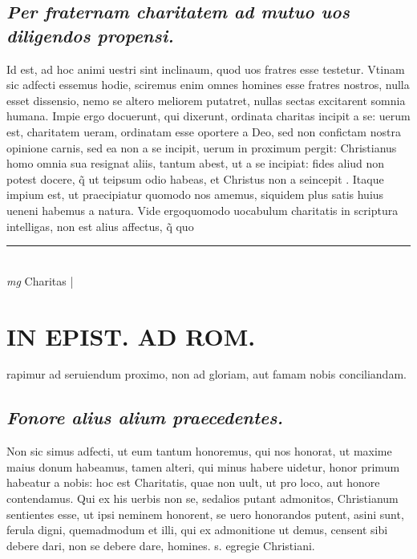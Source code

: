 \documentclass{article}
\begin{document}
\begin{pages}
\subsection*{\textit{Per fraternam charitatem ad mutuo uos diligendos propensi. }}\pstart Id est, ad hoc animi uestri sint inclinaum, quod uos fratres esse testetur. Vtinam sic adfecti essemus hodie, sciremus enim omnes homines esse fratres nostros, nulla esset dissensio, nemo se altero meliorem putatret, nullas sectas excitarent somnia humana. Impie ergo docuerunt, qui dixerunt, ordinata charitas incipit a se: uerum est, charitatem ueram, ordinatam esse oportere a Deo, sed non confictam nostra opinione carnis, sed ea non a se incipit, uerum in proximum pergit: Christianus homo omnia sua resignat aliis, tantum abest, ut a se incipiat: fides aliud non potest docere, q̃ ut teipsum odio habeas, et Christus non a seincepit . Itaque impium est, ut praecipiatur quomodo nos amemus, siquidem plus satis huius ueneni habemus a natura. Vide ergoquomodo uocabulum charitatis in scriptura intelligas, non est alius affectus, q̃ quo  \pend
\vspace{0.5cm}\noindent
\vspace{0.2cm}\rule{1cm}{0.2pt}\\ 
\hspace{0.2cm}\textit{mg}
\footnotesize Charitas 
\normalsize| 
\section*{IN EPIST. AD ROM.  }
\marginpar{[ p.140 ]}\pstart rapimur ad seruiendum proximo, non ad gloriam, aut famam nobis conciliandam.  \pend
{}
{}
\subsection*{\textit{Fonore alius alium praecedentes. }}\pstart Non sic simus adfecti, ut eum tantum honoremus, qui nos honorat, ut maxime maius donum habeamus, tamen alteri, qui minus habere uidetur, honor primum habeatur a nobis: hoc est Charitatis, quae non uult, ut pro loco, aut honore contendamus. Qui ex his uerbis non se, sedalios putant admonitos, Christianum sentientes esse, ut ipsi neminem honorent, se uero honorandos putent, asini sunt, ferula digni, quemadmodum et illi, qui ex admonitione ut demus, censent sibi debere dari, non se debere dare, homines. s. egregie Christiani.  \pend
{}
{}

\end{pages}
\end{document}
